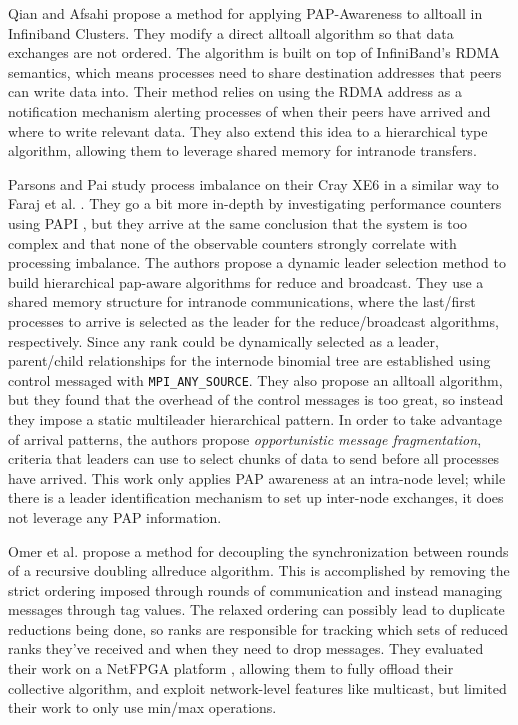 Qian and Afsahi \cite{Qian2009ProcArrivalSHMA2AIB} propose a method for applying PAP-Awareness to alltoall in Infiniband Clusters.
They modify a direct alltoall algorithm so that data exchanges are not ordered.
The algorithm is built on top of InfiniBand's RDMA semantics, which means processes need to share destination addresses that peers can write data into. 
Their method relies on using the RDMA address as a notification mechanism alerting processes of when their peers have arrived and where to write relevant data.
They also extend this idea to a hierarchical type algorithm, allowing them to leverage shared memory for intranode transfers.

Parsons and Pai \cite{Parsons2015ExpProcImbMPICollHierarcialSys} study process imbalance on their Cray XE6 in a similar way to Faraj et al. \cite{Faraj2008StudyProcArrivalMPIColl}.
They go a bit more in-depth by investigating performance counters using PAPI \cite{Mucci1999PAPI}, but they arrive at the same conclusion that the system is too complex and that none of the observable counters strongly correlate with processing imbalance. 
The authors propose a dynamic leader selection method to build hierarchical pap-aware algorithms for reduce and broadcast.
They use a shared memory structure for intranode communications, where the last/first processes to arrive is selected as the leader for the reduce/broadcast algorithms, respectively. 
Since any rank could be dynamically selected as a leader, parent/child relationships for the internode binomial tree are established using control messaged with \texttt{MPI\_ANY\_SOURCE}. 
They also propose an alltoall algorithm, but they found that the overhead of the control messages is too great, so instead they impose a static multileader hierarchical pattern.
In order to take advantage of arrival patterns, the authors propose \textit{opportunistic message fragmentation}, criteria that leaders can use to select chunks of data to send before all processes have arrived.
This work only applies PAP awareness at an intra-node level; while there is a leader identification mechanism to set up inter-node exchanges, it does not leverage any PAP information.

Omer et al. \cite{Arap2015AdaptiveRDForCC} propose a method for decoupling the synchronization between rounds of a recursive doubling allreduce algorithm. 
This is accomplished by removing the strict ordering imposed through rounds of communication and instead managing messages through tag values.
The relaxed ordering can possibly lead to duplicate reductions being done, so ranks are responsible for tracking which sets of reduced ranks they've received and when they need to drop messages.
They evaluated their work on a NetFPGA platform \cite{Lockwood2007NetFPGA}, allowing them to fully offload their collective algorithm, and exploit network-level features like multicast, but limited their work to only use min/max operations.

